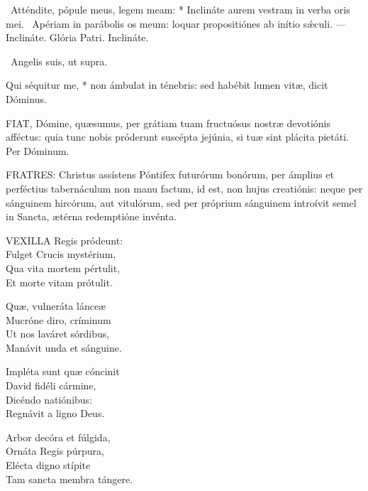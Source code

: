 \R\ Atténdite, pópule meus, legem meam: * Inclináte aurem vestram in verba oris mei. \V\ Apériam in parábolis os meum: loquar propositiónes ab inítio sǽculi. --- Inclináte. Glória Patri. Inclináte.

\V\ Angelis suis, ut supra.

 Qui séquitur me, * non ámbulat in ténebris: sed habébit lumen vitæ, dicit Dóminus.


\lettrine[lines=2]{F}{IAT}, Dómine, quæsumus, per grátiam tuam fructuósus nostræ devotiónis afféctus: quia tunc nobis próderunt suscépta jejúnia, si tuæ sint plácita pietáti. Per Dóminum.

\sectionornament





\lettrine[lines=2]{F}{RATRES}: Christus assístens Póntifex futurórum bonórum, per ámplius et perféctius tabernáculum non manu factum, id est, non hujus creatiónis: neque per sánguinem hircórum, aut vitulórum, sed per próprium sánguinem introívit semel in Sancta, ætérna redemptióne invénta.


\lettrine[lines=2]{V}{EXILLA} Regis pródeunt:\\
Fulget Crucis mystérium,\\
Qua vita mortem pértulit,\\
Et morte vitam prótulit.

Quæ, vulneráta lánceæ\\
Mucróne diro, críminum\\
Ut nos laváret sórdibus,\\
Manávit unda et sánguine.

Impléta sunt quæ cóncinit\\
David fidéli cármine,\\
Dicéndo natiónibus:\\
Regnávit a ligno Deus.

Arbor decóra et fúlgida,\\
Ornáta Regis púrpura,\\
Elécta digno stípite\\
Tam sancta membra tángere.

